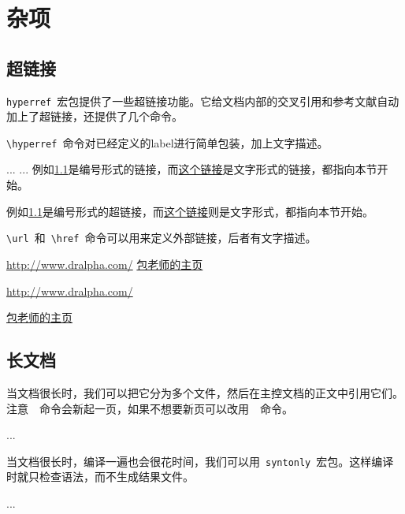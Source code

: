 \chapter{杂项}

\section{超链接}
\label{sec:hyperlink}

\verb|hyperref|~宏包\citep{Rahtz_2006}提供了一些超链接功能。它给文档内部的交叉引用和参考文献自动加上了超链接，还提供了几个命令。

\verb|\hyperref|~命令对已经定义的label进行简单包装，加上文字描述。

\begin{code}
\usepackage{hyperref}
...
\label{sec:hyperlink}
...
例如\ref{sec:hyperlink}是编号形式的链接，而\hyperref[sec:hyperlink]{这个链接}是文字形式的链接，都指向本节开始。
\end{code}

\begin{out}
例如\ref{sec:hyperlink}是编号形式的超链接，而\hyperref[sec:hyperlink]{这个链接}则是文字形式，都指向本节开始。
\end{out}

\verb|\url|~和~\verb|\href|~命令可以用来定义外部链接，后者有文字描述。

\begin{code}
\url{http://www.dralpha.com/}
\href{http://www.dralpha.com/}{包老师的主页}
\end{code}

\begin{out}
\url{http://www.dralpha.com/}

\href{http://www.dralpha.com/}{包老师的主页}
\end{out}


\section{长文档}
当文档很长时，我们可以把它分为多个文件，然后在主控文档的正文中引用它们。注意~\verb||~命令会新起一页，如果不想要新页可以改用~\verb||~命令。
\begin{code}



...

\end{code}

当文档很长时，编译一遍也会很花时间，我们可以用~\verb|syntonly|~宏包。这样编译时就只检查语法，而不生成结果文件。
\begin{code}
\usepackage{syntonly}
...
\syntaxonly
\end{code}

